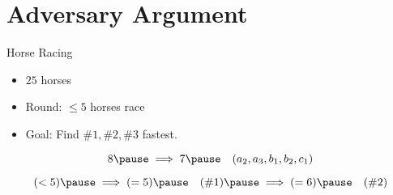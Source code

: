 \section{Adversary Argument}

\begin{frame}{Horse Racing}
  \begin{example}
	\begin{itemize}
	  \item $25$ horses
	  \item Round: $\le 5$ horses race
	  \item Goal: Find $\#1, \#2, \#3$ fastest.
	\end{itemize}
  \end{example}

  \pause
  \[ 8 \pause \implies 7 \pause \quad (a_2, a_3, b_1, b_2, c_1) \]

  \pause
  \[ (< 5) \pause \implies (= 5) \pause \quad (\#1) \pause \implies (= 6) \pause \quad (\#2)\]
\end{frame}
